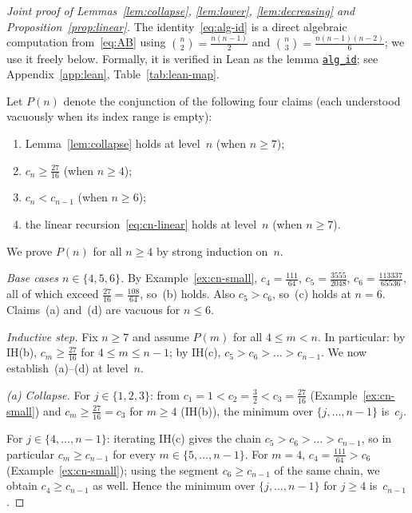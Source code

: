 \documentclass[reqno,final,11pt]{amsart}
\theoremstyle{plain}
\theoremstyle{definition}
\theoremstyle{remark}
\begin{document}
\begin{proof}[Joint proof of Lemmas~\ref{lem:collapse},
  \ref{lem:lower}, \ref{lem:decreasing} and Proposition~\ref{prop:linear}]
  The identity~\eqref{eq:alg-id} is a direct algebraic computation
  from~\eqref{eq:AB} using $\binom{n}{2}=\tfrac{n(n-1)}{2}$ and
  $\binom{n}{3}=\tfrac{n(n-1)(n-2)}{6}$; we use it freely below.
  Formally, it is verified in Lean as the lemma
  \href{https://github.com/pfaffelh/coins/blob/c60bcd3/CoinsLean/CoinsLean/Perturbation.lean\#L932}{\texttt{alg\_id}};
  see Appendix~\ref{app:lean}, Table~\ref{tab:lean-map}.

  Let $P(n)$ denote the conjunction of the following
  four claims (each understood vacuously when its index range is
  empty):
  \begin{enumerate}[\rm(a)]
  \item Lemma~\ref{lem:collapse} holds at level~$n$ (when $n\ge 7$);
  \item $c_n\ge\tfrac{27}{16}$ (when $n\ge 4$);
  \item $c_n<c_{n-1}$ (when $n\ge 6$);
  \item the linear recursion~\eqref{eq:cn-linear} holds at level~$n$
    (when $n\ge 7$).
  \end{enumerate}
  We prove $P(n)$ for all $n\ge 4$ by strong induction on~$n$.

  \medskip
  \emph{Base cases $n\in\{4,5,6\}$.}  By Example~\ref{ex:cn-small},
  $c_4=\tfrac{111}{64}$, $c_5=\tfrac{3555}{2048}$,
  $c_6=\tfrac{113337}{65536}$, all of which exceed
  $\tfrac{27}{16}=\tfrac{108}{64}$, so~(b) holds.  Also $c_5>c_6$,
  so~(c) holds at $n=6$.  Claims~(a) and~(d) are vacuous for
  $n\le 6$.

  \medskip
  \emph{Inductive step.}  Fix $n\ge 7$ and assume $P(m)$ for all
  $4\le m<n$.  In particular: by IH(b),
  $c_m\ge\tfrac{27}{16}$ for $4\le m\le n-1$; by IH(c),
  $c_5>c_6>\dots>c_{n-1}$.  We now establish~(a)--(d) at level~$n$.

  \emph{(a) Collapse.}  For $j\in\{1,2,3\}$: from
  $c_1=1<c_2=\tfrac32<c_3=\tfrac{27}{16}$ (Example~\ref{ex:cn-small})
  and $c_m\ge\tfrac{27}{16}=c_3$ for $m\ge 4$ (IH(b)), the minimum
  over $\{j,\dots,n-1\}$ is~$c_j$.

  For $j\in\{4,\dots,n-1\}$: iterating IH(c) gives the chain
  $c_5>c_6>\dots>c_{n-1}$, so in particular
  $c_m\ge c_{n-1}$ for every $m\in\{5,\dots,n-1\}$.  For $m=4$,
  $c_4=\tfrac{111}{64}>c_6$ (Example~\ref{ex:cn-small}); using the
  segment $c_6\ge c_{n-1}$ of the same chain, we obtain $c_4\ge
  c_{n-1}$ as well.  Hence the minimum over $\{j,\dots,n-1\}$ for
  $j\ge 4$ is~$c_{n-1}$.


\end{proof}
\end{document}
